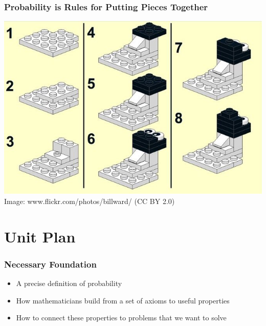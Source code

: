 \documentclass[12pt, block=fill]{beamer}
\begin{document}
\begin{frame}
  \frametitle{Probability is Rules for Putting Pieces Together}

  \centering 
  \includegraphics[width=.8\textwidth]{figures/sheep} \\ 
  \footnotesize Image: www.flickr.com/photos/billward/ (CC BY 2.0)
\end{frame}

\section{Unit Plan}

\begin{frame}
  \frametitle{Necessary Foundation}
  
  \begin{itemize}
  \item  A precise definition of probability
  \item  How mathematicians build from a set of axioms to useful properties
  \item How to connect these properties to problems that we want to solve
 \end{itemize}
  
\end{frame}

\end{document}
